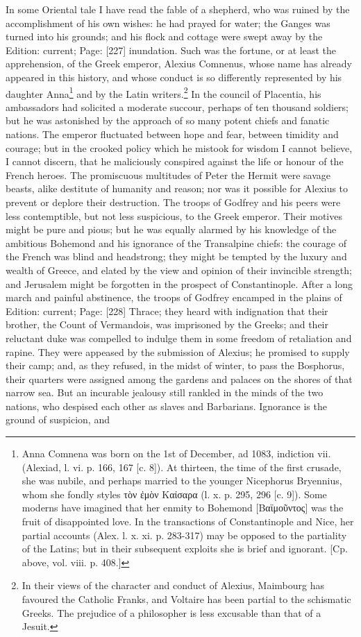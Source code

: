 In some Oriental tale I have read the fable of a shepherd, who was ruined by the accomplishment of his own wishes: he had prayed for water; the Ganges was turned into his grounds; and his flock and cottage were swept away by the Edition: current; Page: [227] inundation. Such was the fortune, or at least the apprehension, of the Greek emperor, Alexius Comnenus, whose name has already appeared in this history, and whose conduct is so differently represented by his daughter Anna\footnote{Anna Comnena was born on the 1st of December, ad 1083, indiction vii. (Alexiad, l. vi. p. 166, 167 [c. 8]). At thirteen, the time of the first crusade, she was nubile, and perhaps married to the younger Nicephorus Bryennius, whom she fondly styles \textgreek{τ\texthebrew{ὸ}ν \texthebrew{ἐ}μ\texthebrew{ὸ}ν Καίσαρα} (l. x. p. 295, 296 [c. 9]). Some moderns have imagined that her enmity to Bohemond [\textgreek{Βαϊμο\texthebrew{ῦ}ντος}] was the fruit of disappointed love. In the transactions of Constantinople and Nice, her partial accounts (Alex. l. x. xi. p. 283-317) may be opposed to the partiality of the Latins; but in their subsequent exploits she is brief and ignorant. [Cp. above, vol. viii. p. 408.]} and by the Latin writers.\footnote{In their views of the character and conduct of Alexius, Maimbourg has favoured the Catholic Franks, and Voltaire has been partial to the schismatic Greeks. The prejudice of a philosopher is less excusable than that of a Jesuit.} In the council of Placentia, his ambassadors had solicited a moderate succour, perhaps of ten thousand soldiers; but he was astonished by the approach of so many potent chiefs and fanatic nations. The emperor fluctuated between hope and fear, between timidity and courage; but in the crooked policy which he mistook for wisdom I cannot believe, I cannot discern, that he maliciously conspired against the life or honour of the French heroes. The promiscuous multitudes of Peter the Hermit were savage beasts, alike destitute of humanity and reason; nor was it possible for Alexius to prevent or deplore their destruction. The troops of Godfrey and his peers were less contemptible, but not less suspicious, to the Greek emperor. Their motives might be pure and pious; but he was equally alarmed by his knowledge of the ambitious Bohemond and his ignorance of the Transalpine chiefs: the courage of the French was blind and headstrong; they might be tempted by the luxury and wealth of Greece, and elated by the view and opinion of their invincible strength; and Jerusalem might be forgotten in the prospect of Constantinople. After a long march and painful abstinence, the troops of Godfrey encamped in the plains of Edition: current; Page: [228] Thrace; they heard with indignation that their brother, the Count of Vermandois, was imprisoned by the Greeks; and their reluctant duke was compelled to indulge them in some freedom of retaliation and rapine. They were appeased by the submission of Alexius; he promised to supply their camp; and, as they refused, in the midst of winter, to pass the Bosphorus, their quarters were assigned among the gardens and palaces on the shores of that narrow sea. But an incurable jealousy still rankled in the minds of the two nations, who despised each other as slaves and Barbarians. Ignorance is the ground of suspicion, and 